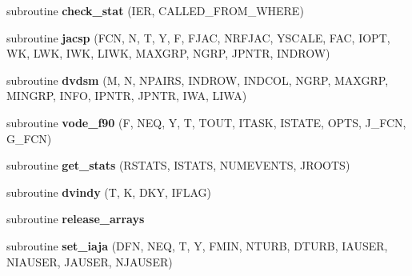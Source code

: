 \begin{DoxyCompactItemize}
\item 
\mbox{\label{interfacedvode__f90__m_1_1dvode__f90_abfeda3368bcf2f3ba89b0f03f16f79c1}} 
subroutine {\bfseries check\+\_\+stat} (I\+ER, C\+A\+L\+L\+E\+D\+\_\+\+F\+R\+O\+M\+\_\+\+W\+H\+E\+RE)
\item 
\mbox{\label{interfacedvode__f90__m_1_1dvode__f90_a300211e2fef4f271bddb2645153abb91}} 
subroutine {\bfseries jacsp} (F\+CN, N, T, Y, F, F\+J\+AC, N\+R\+F\+J\+AC, Y\+S\+C\+A\+LE, F\+AC, I\+O\+PT, WK, L\+WK, I\+WK, L\+I\+WK, M\+A\+X\+G\+RP, N\+G\+RP, J\+P\+N\+TR, I\+N\+D\+R\+OW)
\item 
\mbox{\label{interfacedvode__f90__m_1_1dvode__f90_af6c3d55a97ef9421a386a46138022cf7}} 
subroutine {\bfseries dvdsm} (M, N, N\+P\+A\+I\+RS, I\+N\+D\+R\+OW, I\+N\+D\+C\+OL, N\+G\+RP, M\+A\+X\+G\+RP, M\+I\+N\+G\+RP, I\+N\+FO, I\+P\+N\+TR, J\+P\+N\+TR, I\+WA, L\+I\+WA)
\item 
\mbox{\label{interfacedvode__f90__m_1_1dvode__f90_a4f6f79cb625da6c124fc7423939c239c}} 
subroutine {\bfseries vode\+\_\+f90} (F, N\+EQ, Y, T, T\+O\+UT, I\+T\+A\+SK, I\+S\+T\+A\+TE, O\+P\+TS, J\+\_\+\+F\+CN, G\+\_\+\+F\+CN)
\item 
\mbox{\label{interfacedvode__f90__m_1_1dvode__f90_aa5fa2c61d1b502a19e8c2a19305d99f8}} 
subroutine {\bfseries get\+\_\+stats} (R\+S\+T\+A\+TS, I\+S\+T\+A\+TS, N\+U\+M\+E\+V\+E\+N\+TS, J\+R\+O\+O\+TS)
\item 
\mbox{\label{interfacedvode__f90__m_1_1dvode__f90_aa9e3eb203265c91a924ab5ccd2579012}} 
subroutine {\bfseries dvindy} (T, K, D\+KY, I\+F\+L\+AG)
\item 
\mbox{\label{interfacedvode__f90__m_1_1dvode__f90_a665e5db313a9236bee20be06dce0e17e}} 
subroutine {\bfseries release\+\_\+arrays}
\item 
\mbox{\label{interfacedvode__f90__m_1_1dvode__f90_a1ecdbe3ecdd01e8c44092fc6d8670812}} 
subroutine {\bfseries set\+\_\+iaja} (D\+FN, N\+EQ, T, Y, F\+M\+IN, N\+T\+U\+RB, D\+T\+U\+RB, I\+A\+U\+S\+ER, N\+I\+A\+U\+S\+ER, J\+A\+U\+S\+ER, N\+J\+A\+U\+S\+ER)

\end{DoxyCompactItemize}
